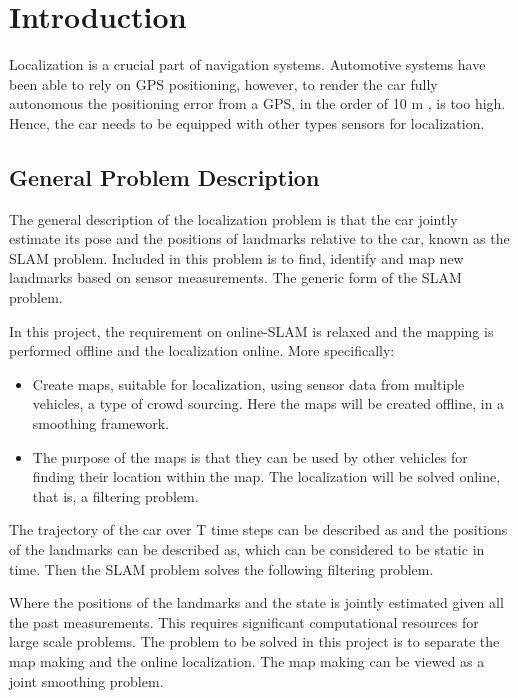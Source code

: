 \section{Introduction}

Localization is a crucial part of navigation systems. Automotive
systems have been able to rely on GPS positioning, however, to render
the car fully autonomous the positioning error from a GPS, in the
order of 10 m \cite{4770175}, is too high. Hence, the car needs to be
equipped with other types sensors for localization.

\subsection{General Problem Description}

The general description of the localization problem is that the car
jointly estimate its pose and the positions of landmarks relative to
the car, known as the \gls{SLAM} problem. Included in this problem is
to find, identify and map new landmarks based on sensor
measurements. The generic form of the \gls{SLAM} problem.

In this project, the requirement on online-\gls{SLAM} is relaxed and
the mapping is performed offline and the localization online. More
specifically:
\begin{itemize}
\item Create maps, suitable for localization, using sensor data from
  multiple vehicles, a type of crowd sourcing. Here the maps will be
  created offline, in a smoothing framework.

\item The purpose of the maps is that they can be used by other
  vehicles for finding their location within the map. The localization
  will be solved online, that is, a filtering problem.

\end{itemize}

The trajectory of the car over T time steps can be described as   and
the positions of the landmarks can be described as, which can be
considered to be static in time. Then the \gls{SLAM} problem solves
the following filtering problem.

Where the positions of the landmarks and the state is jointly
estimated given all the past measurements. This requires significant
computational resources for large scale problems. The problem to be
solved in this project is to separate the map making and the online
localization. The map making can be viewed as a joint smoothing
problem.


